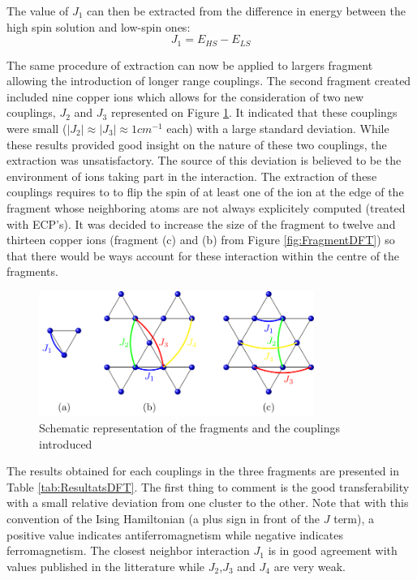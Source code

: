 \documentclass[12pt]{report}
\numberwithin{equation}{section}
\begin{document}
The value of $J_1$ can then be extracted from the difference in energy between the high spin solution and low-spin ones:
\begin{equation}
    J_1=E_{HS}-E_{LS}
\end{equation}

The same procedure of extraction can now be applied to largers fragment allowing the introduction of longer range couplings.
The second fragment created included nine copper ions which allows for the consideration of two new couplings, $J_2$ and $J_3$ represented on Figure \ref{fig:CouplageDFT}.
It indicated that these couplings were small ($|J_{2}|\approx |J_{3}|\approx1 cm^{-1}$ each) with a large standard deviation.
While these results provided good insight on the nature of these two couplings, the extraction was unsatisfactory.
The source of this deviation is believed to be the environment of ions taking part in the interaction. 
The extraction of these couplings requires to to flip the spin of at least one of the ion at the edge of the fragment whose neighboring atoms are not always explicitely computed (treated with ECP's).
It was decided to increase the size of the fragment to twelve and thirteen copper ions (fragment (c) and (b) from Figure \ref{fig:FragmentDFT}) so that there would be ways account for these interaction within the centre of the fragments.


\begin{figure}[!ht]
    \centering
    \includegraphics[width=0.8\textwidth]{Images/ModeleDFT_plan.png}
    \caption{Schematic representation of the fragments and the couplings introduced}
    \label{fig:CouplageDFT}
\end{figure}

The results obtained for each couplings in the three fragments are presented in Table \ref{tab:ResultatsDFT}.
The first thing to comment is the good transferability with a small relative deviation from one cluster to the other.
Note that with this convention of the Ising Hamiltonian (a plus sign in front of the $J$ term), a positive value indicates antiferromagnetism while negative indicates ferromagnetism.
The closest neighbor interaction $J_1$ is in good agreement with values published in the litterature while $J_2$,$J_3$ and $J_4$ are very weak. 
\end{document}
